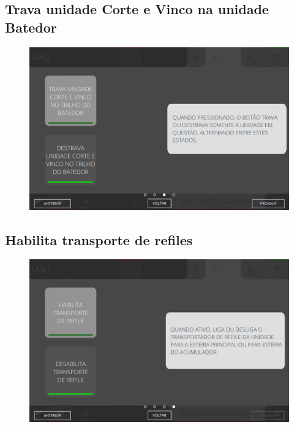 \newpage
\thispagestyle{fancy}
\vspace{\fill}
\subsection{Trava unidade Corte e Vinco na unidade Batedor}
\begin{figure}
    \centering
    \includegraphics[width=480 px,height=300 px]{src/imagesICV/06-dryCutter/commands/e-3.png}
\end{figure}

\newpage
\thispagestyle{fancy}
\vspace{\fill}
\subsection{Habilita transporte de refiles}
\begin{figure}
    \centering
    \includegraphics[width=576 px,height=360 px]{src/imagesICV/06-dryCutter/commands/e-4.png}
\end{figure}